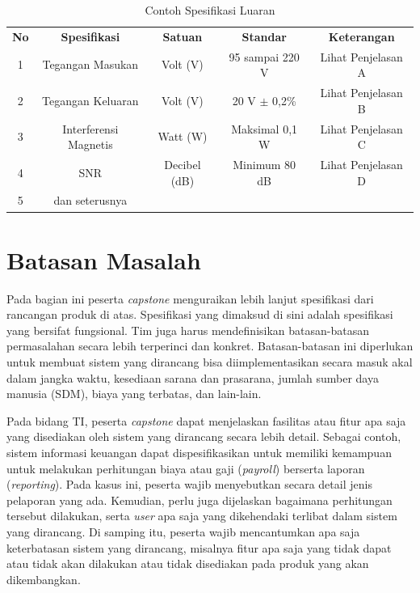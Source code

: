     \begin{longtable}{|c|c|c|c|c|}
        \caption{Contoh Spesifikasi Luaran} 
        \label{tab:Ch06_Contoh_Spesifikasi_Luaran}
        \vspace{-0.75em}\\
        \hline
        \textbf{No} & \textbf{Spesifikasi}  & \textbf{Satuan} & \textbf{Standar} & \textbf{Keterangan} \\ \hline
        1           & Tegangan Masukan      & Volt (V)        & 95 sampai 220 V  & Lihat Penjelasan A  \\ \hline
        2           & Tegangan Keluaran     & Volt (V)        & 20 V $\pm$ 0,2\% & Lihat Penjelasan B  \\ \hline
        3           & Interferensi Magnetis & Watt (W)        & Maksimal 0,1 W   & Lihat Penjelasan C  \\ \hline
        4           & SNR                   & Decibel (dB)    & Minimum 80 dB    & Lihat Penjelasan D  \\ \hline
        5           & dan seterusnya        &                 &                  &                     \\ \hline
    \end{longtable}

\section{Batasan Masalah}
\label{sec:Batasan_Masalah}
    
    Pada bagian ini peserta \textit{capstone} menguraikan lebih lanjut spesifikasi dari rancangan produk di atas. Spesifikasi yang dimaksud di sini adalah spesifikasi yang bersifat fungsional. Tim juga harus mendefinisikan batasan-batasan permasalahan secara lebih terperinci dan konkret. Batasan-batasan ini diperlukan untuk membuat sistem yang dirancang bisa diimplementasikan secara masuk akal dalam jangka waktu, kesediaan sarana dan prasarana, jumlah sumber daya manusia (SDM), biaya yang terbatas, dan lain-lain. 

    Pada bidang TI, peserta \textit{capstone} dapat menjelaskan fasilitas atau fitur apa saja yang disediakan oleh sistem yang dirancang secara lebih detail. Sebagai contoh, sistem informasi keuangan dapat dispesifikasikan untuk memiliki kemampuan untuk melakukan perhitungan biaya atau gaji (\textit{payroll}) berserta laporan (\textit{reporting}). Pada kasus ini, peserta wajib menyebutkan secara detail jenis pelaporan yang ada. Kemudian, perlu juga dijelaskan bagaimana perhitungan tersebut dilakukan, serta \textit{user} apa saja yang dikehendaki terlibat dalam sistem yang dirancang. Di samping itu, peserta wajib mencantumkan apa saja keterbatasan sistem yang dirancang, misalnya fitur apa saja yang tidak dapat atau tidak akan dilakukan atau tidak disediakan pada produk yang akan dikembangkan. 

